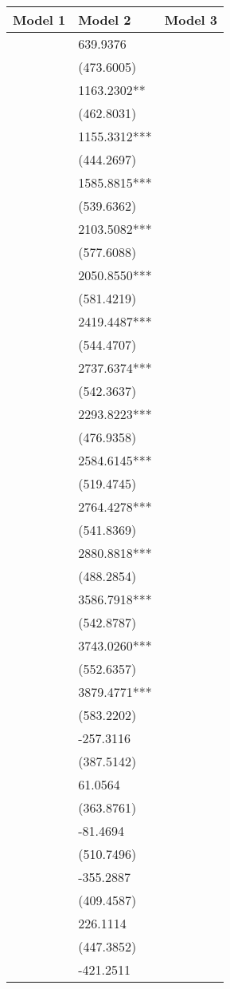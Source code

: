 \begin{tabular}{lll}
\toprule
Model 1 & Model 2 & Model 3 \\
\midrule
 & 639.9376 &  \\
 & (473.6005) &  \\
 & 1163.2302** &  \\
 & (462.8031) &  \\
 & 1155.3312*** &  \\
 & (444.2697) &  \\
 & 1585.8815*** &  \\
 & (539.6362) &  \\
 & 2103.5082*** &  \\
 & (577.6088) &  \\
 & 2050.8550*** &  \\
 & (581.4219) &  \\
 & 2419.4487*** &  \\
 & (544.4707) &  \\
 & 2737.6374*** &  \\
 & (542.3637) &  \\
 & 2293.8223*** &  \\
 & (476.9358) &  \\
 & 2584.6145*** &  \\
 & (519.4745) &  \\
 & 2764.4278*** &  \\
 & (541.8369) &  \\
 & 2880.8818*** &  \\
 & (488.2854) &  \\
 & 3586.7918*** &  \\
 & (542.8787) &  \\
 & 3743.0260*** &  \\
 & (552.6357) &  \\
 & 3879.4771*** &  \\
 & (583.2202) &  \\
 & -257.3116 &  \\
 & (387.5142) &  \\
 & 61.0564 &  \\
 & (363.8761) &  \\
 & -81.4694 &  \\
 & (510.7496) &  \\
 & -355.2887 &  \\
 & (409.4587) &  \\
 & 226.1114 &  \\
 & (447.3852) &  \\
 & -421.2511 &  \\

\end{tabular}
